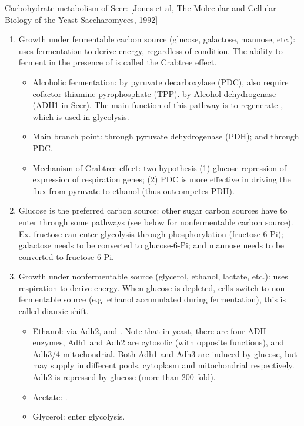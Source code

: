 \documentclass{report}
\begin{document}
Carbohydrate metabolism of Scer: [Jones et al, The Molecular and Cellular Biology of the Yeast Saccharomyces, 1992]
\begin{enumerate}
	\item Growth under fermentable carbon source (glucose, galactose, mannose, etc.): uses fermentation to derive energy, regardless of  condition. The ability to ferment in the presence of  is called the Crabtree effect.  
	\begin{itemize}
		\item Alcoholic fermentation:  by pyruvate decarboxylase (PDC), also require cofactor thiamine pyrophosphate (TPP).   by Alcohol dehydrogenase (ADH1 in Scer). The main function of this pathway is to regenerate , which is used in glycolysis. 
		\item Main branch point:  through pyruvate dehydrogenase (PDH); and  through PDC. 
		\item Mechanism of Crabtree effect: two hypothesis (1) glucose repression of expression of respiration genes; (2) PDC is more effective in driving the flux from pyruvate to ethanol (thus outcompetes PDH). 
	\end{itemize}
	
	\item Glucose is the preferred carbon source: other sugar carbon sources have to enter through some pathways (see below for nonfermentable carbon source). Ex. fructose can enter glycolysis through phosphorylation (fructose-6-Pi); galactose needs to be converted to glucose-6-Pi; and mannose needs to be converted to fructose-6-Pi. 
	
	\item Growth under nonfermentable source (glycerol, ethanol, lactate, etc.): uses respiration to derive energy. When glucose is depleted, cells switch to non-fermentable source (e.g. ethanol accumulated during fermentation), this is called diauxic shift. 
	\begin{itemize}
		\item Ethanol:  via Adh2, and . Note that in yeast, there are four ADH enzymes, Adh1 and Adh2 are cytosolic (with opposite functions), and Adh3/4 mitochondrial. Both Adh1 and Adh3 are induced by glucose, but may supply  in different pools, cytoplasm and mitochondrial respectively. Adh2 is repressed by glucose (more than 200 fold). 
		\item Acetate: . 
		\item Glycerol: enter glycolysis. 
	\end{itemize}
	

\end{enumerate}
\end{document}
